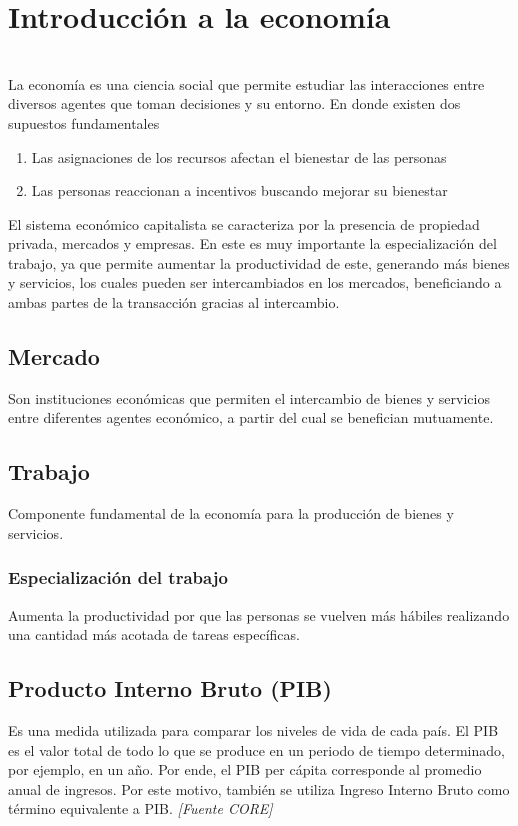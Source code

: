 \section{Introducción a la economía}
\\


La economía es una ciencia social que permite estudiar las interacciones entre diversos agentes que toman decisiones y su entorno. En donde existen dos supuestos fundamentales

\begin{enumerate}[label=\arabic*)]
    \item Las asignaciones de los recursos afectan el bienestar de las personas
    \item Las personas reaccionan a incentivos buscando mejorar su bienestar
\end{enumerate}


El sistema económico capitalista se caracteriza por la presencia de propiedad privada, mercados y empresas. En este es muy importante la especialización del trabajo, ya que permite aumentar la productividad de este, generando más bienes y servicios, los cuales pueden ser intercambiados en los mercados, beneficiando a ambas partes de la transacción gracias al intercambio.

\subsection{Mercado}
Son instituciones económicas que permiten el intercambio de bienes y servicios entre diferentes agentes económico, a partir del cual se benefician mutuamente.

\subsection{Trabajo}
Componente fundamental de la economía para la producción de bienes y servicios.
\subsubsection{Especialización del trabajo}
Aumenta la productividad por que las personas se vuelven más hábiles realizando una cantidad más acotada de tareas específicas.

\subsection{Producto Interno Bruto (PIB)}
Es una medida utilizada para comparar los niveles de vida de cada país. El PIB es el valor total de todo lo que se produce en un periodo de tiempo determinado, por ejemplo, en un año. Por ende, el PIB per cápita corresponde al promedio anual de ingresos. Por este motivo, también se utiliza Ingreso Interno Bruto como término equivalente a PIB. \textit{[Fuente CORE]}


